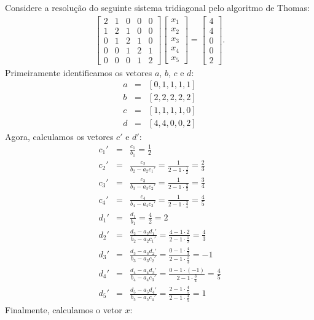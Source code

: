 \begin{ex}\label{linsis:exemplo5_5}
Considere a resolução do seguinte sistema tridiagonal pelo algoritmo de Thomas:
 \begin{eqnarray}\label{linsis:Exemplo5_5} \begin{bmatrix}
   { 2 } & { 1 } & { 0 } & { 0 } & { 0 } \\
   { 1 } & { 2 } & { 1 } & { 0 } & { 0 } \\
   { 0 } & { 1 } & { 2 } & { 1 } & { 0 } \\
   { 0 } & { 0 } & { 1 } & { 2 } & { 1 } \\
   { 0 } & { 0 } & { 0 } & { 1 } & { 2 } 
 \end{bmatrix}
\begin{bmatrix}
   {x_1 }  \\
   {x_2 }  \\
   {x_3 }  \\
   {x_4 }  \\
   {x_5 }  
\end{bmatrix}
=
\begin{bmatrix}
   {4}  \\
   {4 }  \\
   {0}  \\
   {0}\\
   {2 }  
\end{bmatrix}
.
\end{eqnarray}
Primeiramente identificamos os vetores $a$, $b$, $c$ e $d$:
\begin{eqnarray*}
 a&=& [0, 1, 1, 1, 1 ]\\
 b&=& [2, 2, 2, 2, 2 ]\\
 c&=& [1, 1, 1, 1, 0 ]\\
 d&=& [4, 4, 0, 0, 2 ]
\end{eqnarray*}
Agora, calculamos os vetores $c'$ e $d'$:
\begin{eqnarray*}
 c_1'&=&\frac{c_1}{b_1}=\frac{1}{2}\\
 c_2'&=&\frac{c_2}{b_2-a_2c_1'}=\frac{1}{2-1\cdot \frac{1}{2}}=\frac{2}{3} \\
 c_3'&=&\frac{c_3}{b_3-a_3c_2'}=\frac{1}{2-1\cdot \frac{2}{3}}=\frac{3}{4} \\
 c_4'&=&\frac{c_4}{b_4-a_4c_3'}=\frac{1}{2-1\cdot \frac{3}{4}}=\frac{4}{5} \\
 d_1'&=&\frac{d_1}{b_1}=\frac{4}{2}=2\\
 d_2'&=&\frac{d_2-a_2d_1'}{b_2-a_2c_1'}=\frac{4-1\cdot 2}{2-1\cdot \frac{1}{2}}=\frac{4}{3} \\
 d_3'&=&\frac{d_3-a_3d_2'}{b_3-a_3c_2'}=\frac{0-1\cdot \frac{4}{3}}{2-1\cdot \frac{2}{3}}=-1 \\
 d_4'&=&\frac{d_4-a_4d_3'}{b_4-a_4c_3'}=\frac{0-1\cdot (-1)}{2-1\cdot \frac{3}{4}}=\frac{4}{5} \\
 d_5'&=&\frac{d_5-a_5d_4'}{b_5-a_5c_4'}=\frac{2-1\cdot \frac{4}{5}}{2-1\cdot \frac{4}{5}}=1 
\end{eqnarray*}
 Finalmente, calculamos o vetor $x$:


\end{ex}
